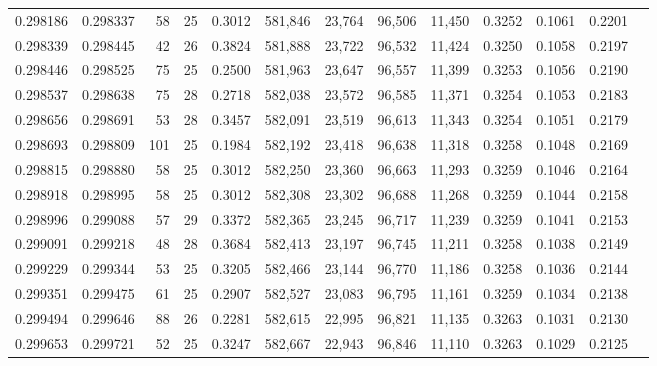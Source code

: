 \begin{tabular}{rrrrrrrrrrrrr}
0.298186 & 0.298337 &  58 &  25 &                                     0.3012 & 581,846 &  23,764 &  96,506 &  11,450 & 0.3252 & 0.1061 & 0.2201 \\
0.298339 & 0.298445 &  42 &  26 &                                     0.3824 & 581,888 &  23,722 &  96,532 &  11,424 & 0.3250 & 0.1058 & 0.2197 \\
0.298446 & 0.298525 &  75 &  25 &                                     0.2500 & 581,963 &  23,647 &  96,557 &  11,399 & 0.3253 & 0.1056 & 0.2190 \\
0.298537 & 0.298638 &  75 &  28 &                                     0.2718 & 582,038 &  23,572 &  96,585 &  11,371 & 0.3254 & 0.1053 & 0.2183 \\
0.298656 & 0.298691 &  53 &  28 &                                     0.3457 & 582,091 &  23,519 &  96,613 &  11,343 & 0.3254 & 0.1051 & 0.2179 \\
0.298693 & 0.298809 & 101 &  25 &                                     0.1984 & 582,192 &  23,418 &  96,638 &  11,318 & 0.3258 & 0.1048 & 0.2169 \\
0.298815 & 0.298880 &  58 &  25 &                                     0.3012 & 582,250 &  23,360 &  96,663 &  11,293 & 0.3259 & 0.1046 & 0.2164 \\
0.298918 & 0.298995 &  58 &  25 &                                     0.3012 & 582,308 &  23,302 &  96,688 &  11,268 & 0.3259 & 0.1044 & 0.2158 \\
0.298996 & 0.299088 &  57 &  29 &                                     0.3372 & 582,365 &  23,245 &  96,717 &  11,239 & 0.3259 & 0.1041 & 0.2153 \\
0.299091 & 0.299218 &  48 &  28 &                                     0.3684 & 582,413 &  23,197 &  96,745 &  11,211 & 0.3258 & 0.1038 & 0.2149 \\
0.299229 & 0.299344 &  53 &  25 &                                     0.3205 & 582,466 &  23,144 &  96,770 &  11,186 & 0.3258 & 0.1036 & 0.2144 \\
0.299351 & 0.299475 &  61 &  25 &                                     0.2907 & 582,527 &  23,083 &  96,795 &  11,161 & 0.3259 & 0.1034 & 0.2138 \\
0.299494 & 0.299646 &  88 &  26 &                                     0.2281 & 582,615 &  22,995 &  96,821 &  11,135 & 0.3263 & 0.1031 & 0.2130 \\
0.299653 & 0.299721 &  52 &  25 &                                     0.3247 & 582,667 &  22,943 &  96,846 &  11,110 & 0.3263 & 0.1029 & 0.2125 \\

\end{tabular}

